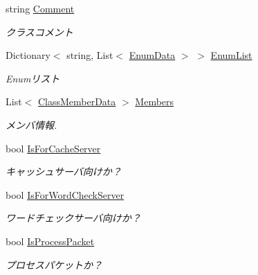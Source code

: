 \begin{DoxyCompactItemize}
string \mbox{\hyperlink{classNativePacketGenerator_1_1ClassData_a7d166d01f44d0774b52fb30a0ceee6ba}{Comment}}
\begin{DoxyCompactList}\small\item\em クラスコメント \end{DoxyCompactList}\item 
Dictionary$<$ string, List$<$ \mbox{\hyperlink{classNativePacketGenerator_1_1EnumData}{Enum\+Data}} $>$ $>$ \mbox{\hyperlink{classNativePacketGenerator_1_1ClassData_a17fef0118f351cd06f49657dacdc8a75}{Enum\+List}}
\begin{DoxyCompactList}\small\item\em Enumリスト \end{DoxyCompactList}\item 
List$<$ \mbox{\hyperlink{structNativePacketGenerator_1_1ClassMemberData}{Class\+Member\+Data}} $>$ \mbox{\hyperlink{classNativePacketGenerator_1_1ClassData_a27ee843ec889d2174d8d48275ace5ddf}{Members}}
\begin{DoxyCompactList}\small\item\em メンバ情報. \end{DoxyCompactList}\item 
bool \mbox{\hyperlink{classNativePacketGenerator_1_1ClassData_a0a3e8076591167022fcf6146b6170737}{Is\+For\+Cache\+Server}}
\begin{DoxyCompactList}\small\item\em キャッシュサーバ向けか？ \end{DoxyCompactList}\item 
bool \mbox{\hyperlink{classNativePacketGenerator_1_1ClassData_ad3989f1c0c88949f21444a1cf0185add}{Is\+For\+Word\+Check\+Server}}
\begin{DoxyCompactList}\small\item\em ワードチェックサーバ向けか？ \end{DoxyCompactList}\item 
bool \mbox{\hyperlink{classNativePacketGenerator_1_1ClassData_a731672882786506135e4636178812c60}{Is\+Process\+Packet}}
\begin{DoxyCompactList}\small\item\em プロセスパケットか？ \end{DoxyCompactList}\end{DoxyCompactItemize}


